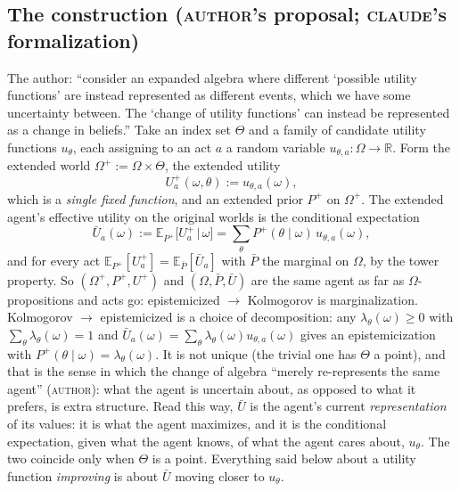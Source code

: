 \documentclass[11pt,a4paper]{article}
\newcommand{\E}{\mathbb{E}}
\newcommand{\R}{\mathbb{R}}
\newcommand{\AUTHOR}{\textnormal{\scshape author}}
\newcommand{\CLAUDE}{\textnormal{\scshape claude}}
\begin{document}
\subsection{The construction (\AUTHOR's proposal; \CLAUDE's formalization)}
The author: ``consider an expanded algebra where different `possible utility functions' are instead represented as different events, which we have some uncertainty between. The `change of utility functions' can instead be represented as a change in beliefs.'' Take an index set $\Theta$ and a family of candidate utility functions $u_\theta$, each assigning to an act $a$ a random variable $u_{\theta, a} : \Omega \to \R$. Form the extended world $\Omega^+ := \Omega \times \Theta$, the extended utility
\[
U^+_a(\omega, \theta) := u_{\theta, a}(\omega),
\]
which is a \emph{single fixed function}, and an extended prior $P^+$ on $\Omega^+$. The extended agent's effective utility on the original worlds is the conditional expectation
\[
\bar U_a(\omega) := \E_{P^+}\bigl[U^+_a \,\big|\, \omega\bigr] = \sum_\theta P^+(\theta \mid \omega)\, u_{\theta, a}(\omega),
\]
and for every act $\E_{P^+}[U^+_a] = \E_{\bar P}[\bar U_a]$ with $\bar P$ the marginal on $\Omega$, by the tower property. So $(\Omega^+, P^+, U^+)$ and $(\Omega, \bar P, \bar U)$ are the same agent as far as $\Omega$-propositions and acts go: epistemicized $\to$ Kolmogorov is marginalization. Kolmogorov $\to$ epistemicized is a choice of decomposition: any $\lambda_\theta(\omega) \ge 0$ with $\sum_\theta \lambda_\theta(\omega) = 1$ and $\bar U_a(\omega) = \sum_\theta \lambda_\theta(\omega) u_{\theta, a}(\omega)$ gives an epistemicization with $P^+(\theta \mid \omega) = \lambda_\theta(\omega)$. It is not unique (the trivial one has $\Theta$ a point), and that is the sense in which the change of algebra ``merely re-represents the same agent'' (\AUTHOR): what the agent is uncertain about, as opposed to what it prefers, is extra structure. Read this way, $\bar U$ is the agent's current \emph{representation} of its values: it is what the agent maximizes, and it is the conditional expectation, given what the agent knows, of what the agent cares about, $u_\theta$. The two coincide only when $\Theta$ is a point. Everything said below about a utility function \emph{improving} is about $\bar U$ moving closer to $u_\theta$.
\end{document}
